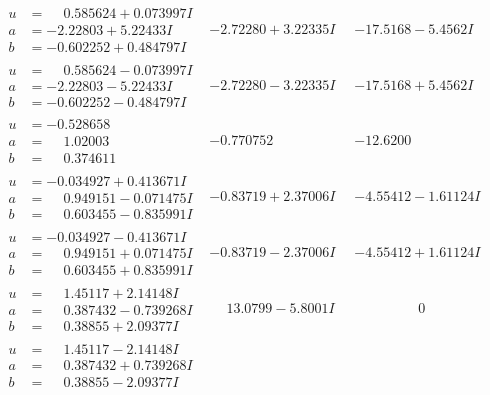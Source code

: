 \documentclass[1p]{elsarticle_modified}
\theoremstyle{definition}
\begin{document}
$$\begin{array}{c|c|c}
\begin{aligned}
u &= \phantom{-}0.585624 + 0.073997 I \\
a &= -2.22803 + 5.22433 I \\
b &= -0.602252 + 0.484797 I\end{aligned}
 & -2.72280 + 3.22335 I & -17.5168 - 5.4562 I \\ \hline\begin{aligned}
u &= \phantom{-}0.585624 - 0.073997 I \\
a &= -2.22803 - 5.22433 I \\
b &= -0.602252 - 0.484797 I\end{aligned}
 & -2.72280 - 3.22335 I & -17.5168 + 5.4562 I \\ \hline\begin{aligned}
u &= -0.528658\phantom{ +0.000000I} \\
a &= \phantom{-}1.02003\phantom{ +0.000000I} \\
b &= \phantom{-}0.374611\phantom{ +0.000000I}\end{aligned}
 & -0.770752\phantom{ +0.000000I} & -12.6200\phantom{ +0.000000I} \\ \hline\begin{aligned}
u &= -0.034927 + 0.413671 I \\
a &= \phantom{-}0.949151 - 0.071475 I \\
b &= \phantom{-}0.603455 - 0.835991 I\end{aligned}
 & -0.83719 + 2.37006 I & -4.55412 - 1.61124 I \\ \hline\begin{aligned}
u &= -0.034927 - 0.413671 I \\
a &= \phantom{-}0.949151 + 0.071475 I \\
b &= \phantom{-}0.603455 + 0.835991 I\end{aligned}
 & -0.83719 - 2.37006 I & -4.55412 + 1.61124 I \\ \hline\begin{aligned}
u &= \phantom{-}1.45117 + 2.14148 I \\
a &= \phantom{-}0.387432 - 0.739268 I \\
b &= \phantom{-}0.38855 + 2.09377 I\end{aligned}
 & \phantom{-}13.0799 - 5.8001 I & \phantom{-0.000000 } 0 \\ \hline\begin{aligned}
u &= \phantom{-}1.45117 - 2.14148 I \\
a &= \phantom{-}0.387432 + 0.739268 I \\
b &= \phantom{-}0.38855 - 2.09377 I\end{aligned}

\end{array}$$
\end{document}

